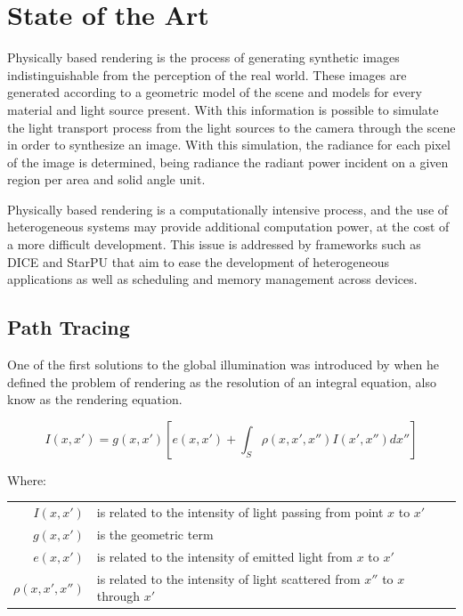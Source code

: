 \chapter{State of the Art}

Physically based rendering is the process of generating synthetic images indistinguishable from the perception of the real world. These images are generated according to a geometric model of the scene and models for every material and light source present. With this information is possible to simulate the light transport process from the light sources to the camera through the scene in order to synthesize an image. With this simulation, the radiance for each pixel of the image is determined, being radiance the radiant power incident on a given region per area and solid angle unit.

Physically based rendering is a computationally intensive process, and the use of heterogeneous systems may provide additional computation power, at the cost of a more difficult development. This issue is addressed by frameworks such as DICE \citep{Barbosa} and StarPU \citep{augonnet2011starpu} that aim to ease the development of heterogeneous applications as well as scheduling and memory management across devices.

\section{Path Tracing}

One of the first solutions to the global illumination was introduced by \cite{Kajiya} when he defined the problem of rendering as the resolution of an integral equation, also know as the rendering equation.

\begin{equation}
I(x,x')=g(x,x')\left[e(x,x')+\int_{S}^{} \rho(x,x',x'')I(x',x'')dx''\right]
\label{eq:render_eq}
\end{equation}

Where:

\begin{tabular}{r l}
$I(x,x')$ & is related to the intensity of light passing from point $x$ to $x'$ \\
$g(x,x')$ & is the geometric term \\
$e(x,x')$ & is related to the intensity of emitted light from $x$ to $x'$ \\
$\rho(x,x',x'')$ & is related to the intensity of light scattered from $x''$ to $x$ through $x'$\\
\end{tabular}
\\

